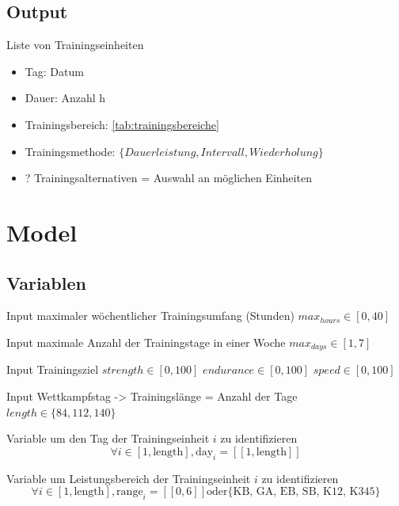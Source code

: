 \subsection{Output}
Liste von Trainingseinheiten
\label{sec:modellierung:output}
    \begin{itemize}
        \item Tag: Datum
        \item Dauer: Anzahl h
        \item Trainingsbereich: \ref{tab:trainingsbereiche}
        \item Trainingsmethode: $\{Dauerleistung, Intervall, Wiederholung\}$
        \item ? Trainingsalternativen = Auswahl an möglichen Einheiten
    \end{itemize}
    
\section{Model}
    \subsection{Variablen}
        Input maximaler wöchentlicher Trainingsumfang (Stunden)
        $max_{hours} \in [0, 40]$
        
        Input maximale Anzahl der Trainingstage in einer Woche
        $max_{days} \in [1, 7]$
        
        Input Trainingsziel
        $strength \in [0, 100]$
        $endurance \in [0, 100]$        
        $speed \in [0, 100]$
                
        Input Wettkampfstag -> Trainingslänge = Anzahl der Tage
        $length \in \{ 84, 112, 140\} $ 
        
        Variable um den Tag der Trainingseinheit $i$ zu identifizieren
        \begin{equation}
            \forall i \in [1, \text{length}], \text{day}_i = [\![1, \text{length}]\!]
        \end{equation}
    
        Variable um Leistungsbereich der Trainingseinheit $i$ zu identifizieren
        \begin{equation}
            \forall i \in [1, \text{length}], \text{range}_i = [\![0, 6]\!] \text{oder} \{\text{KB, GA, EB, SB, K12, K345}\}
        \end{equation}
        
